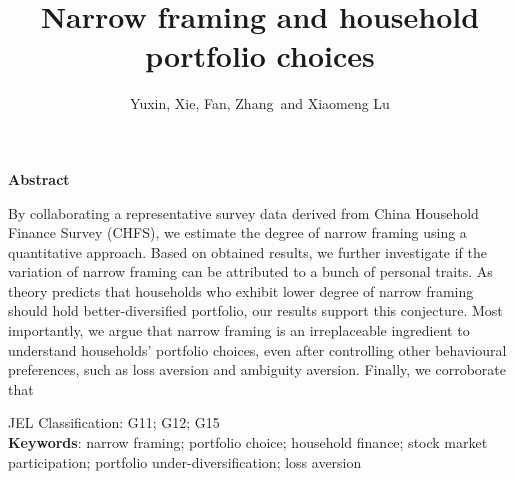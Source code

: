 \documentclass[ukenglish,nottitlepage,thmsb,11pt,letterpaper]{article}
\begin{document}
\title{\Large \bf Narrow framing and household portfolio choices\footnotemark[1]}
\date{}
\author{
	Yuxin, Xie\footnotemark[2],
	Fan, Zhang\footnotemark[3]  \  and
	 Xiaomeng Lu\footnotemark[4]
      }

\begin{minipage}[h]{\textwidth}
\maketitle
\begin{center}
\textbf{Abstract}
\end{center}

\begin{spacing}{2}
By collaborating a representative survey data derived from China Household Finance Survey (CHFS), we estimate the degree of narrow framing using a quantitative approach. Based on obtained results, we further investigate if the variation of narrow framing can be attributed to a bunch of personal traits. As theory predicts that households who exhibit lower degree of narrow framing should hold better-diversified portfolio, our results support this conjecture. Most importantly, we argue that narrow framing is an irreplaceable ingredient to understand households' portfolio choices, even after controlling other behavioural  preferences, such as loss aversion and ambiguity aversion. Finally, we corroborate that \\
\end{spacing}
JEL Classification: G11; G12; G15\\
\textbf{Keywords}: narrow framing; portfolio choice; household finance; stock market participation; portfolio under-diversification; loss aversion\\

\end{minipage}

\end{document}
